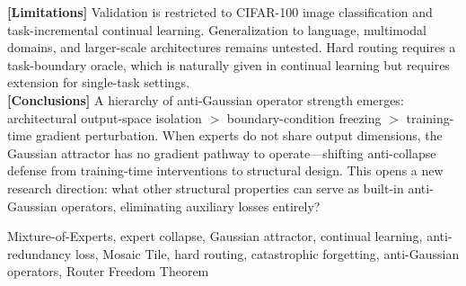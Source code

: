 \documentclass[twoside]{article}
\theoremstyle{definition}
\begin{document}
{{\bf [Limitations]} Validation is restricted to CIFAR-100 image classification and task-incremental continual learning. Generalization to language, multimodal domains, and larger-scale architectures remains untested. Hard routing requires a task-boundary oracle, which is naturally given in continual learning but requires extension for single-task settings.\\

{\bf [Conclusions]} A hierarchy of anti-Gaussian operator strength emerges: architectural output-space isolation $>$ boundary-condition freezing $>$ training-time gradient perturbation. When experts do not share output dimensions, the Gaussian attractor has no gradient pathway to operate---shifting anti-collapse defense from training-time interventions to structural design. This opens a new research direction: what other structural properties can serve as built-in anti-Gaussian operators, eliminating auxiliary losses entirely?
}

{ Mixture-of-Experts, expert collapse, Gaussian attractor, continual learning, anti-redundancy loss, Mosaic Tile, hard routing, catastrophic forgetting, anti-Gaussian operators, Router Freedom Theorem}
\end{document}
